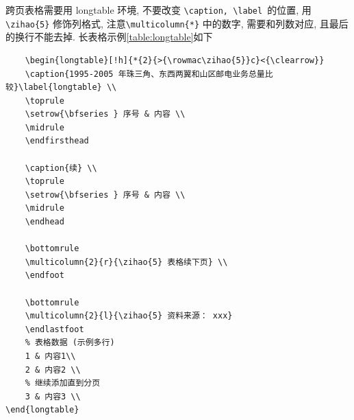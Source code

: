 跨页表格需要用 longtable 环境, 不要改变 \verb|\caption, \label |的位置, 用\verb|\zihao{5}| 修饰列格式, 注意\verb|\multicolumn{*}| 中的数字, 需要和列数对应, 且最后的换行不能去掉. 长表格示例\ref{table:longtable}如下
\begin{lstlisting}
    \begin{longtable}[!h]{*{2}{>{\rowmac\zihao{5}}c}<{\clearrow}}
    \caption{1995-2005 年珠三角、东西两翼和山区邮电业务总量比较}\label{longtable} \\
    \toprule
    \setrow{\bfseries } 序号 & 内容 \\
    \midrule
    \endfirsthead

    \caption{续} \\
    \toprule
    \setrow{\bfseries } 序号 & 内容 \\
    \midrule
    \endhead

    \bottomrule
    \multicolumn{2}{r}{\zihao{5} 表格续下页} \\
    \endfoot

    \bottomrule
    \multicolumn{2}{l}{\zihao{5} 资料来源： xxx}
    \endlastfoot
    % 表格数据 (示例多行)
    1 & 内容1\\
    2 & 内容2 \\
    % 继续添加直到分页
    3 & 内容3 \\
\end{longtable}
\end{lstlisting}
